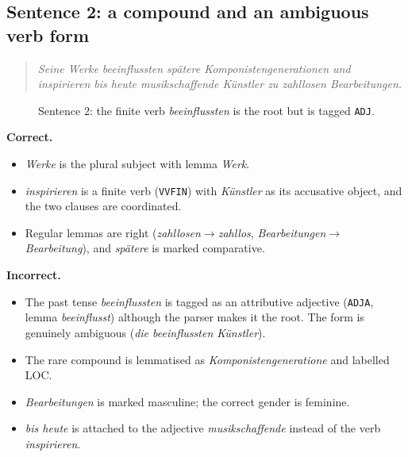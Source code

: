 \documentclass[11pt,a4paper]{article}
\newcommand{\code}[1]{\texttt{#1}}
\newcommand{\de}[1]{\textit{#1}}
\begin{document}
\subsection{Sentence 2: a compound and an ambiguous verb form}
\begin{quote}\de{Seine Werke beeinflussten spätere Komponistengenerationen und inspirieren bis heute musikschaffende Künstler zu zahllosen Bearbeitungen.}\end{quote}
\begin{figure}[h]\centering

\caption{Sentence 2: the finite verb \de{beeinflussten} is the root but is tagged \code{ADJ}.}\label{fig:s2}
\end{figure}
\textbf{Correct.}
\begin{itemize}
  \item \de{Werke} is the plural subject with lemma \de{Werk}.
  \item \de{inspirieren} is a finite verb (\code{VVFIN}) with \de{Künstler} as its accusative object, and the two clauses are coordinated.
  \item Regular lemmas are right (\de{zahllosen}$\to$\de{zahllos}, \de{Bearbeitungen}$\to$\de{Bearbeitung}), and \de{spätere} is marked comparative.
\end{itemize}
\textbf{Incorrect.}
\begin{itemize}
  \item The past tense \de{beeinflussten} is tagged as an attributive adjective (\code{ADJA}, lemma \de{beeinflusst}) although the parser makes it the root. The form is genuinely ambiguous (\de{die beeinflussten Künstler}).
  \item The rare compound is lemmatised as \de{Komponistengeneratione} and labelled LOC.
  \item \de{Bearbeitungen} is marked masculine; the correct gender is feminine.
  \item \de{bis heute} is attached to the adjective \de{musikschaffende} instead of the verb \de{inspirieren}.
\end{itemize}
\end{document}
